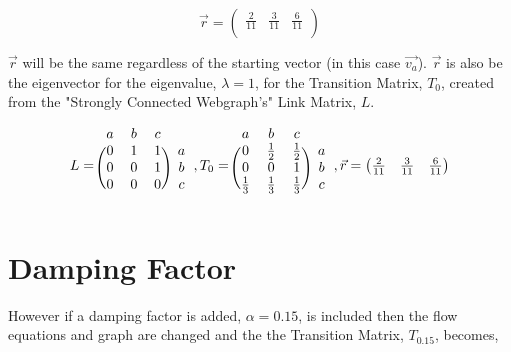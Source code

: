\documentclass[12pt]{article}
\begin{document}
\[
\vec{r} =
%
\begin{pmatrix}
   \frac{2}{11} & \frac{3}{11} & \frac{6}{11} \\
\end{pmatrix}
\]

$\vec{r}$ will be the same regardless of the starting vector (in this case $\vec{v_a}$). $\vec{r}$ is also be the eigenvector for the eigenvalue, $\lambda = 1$, for the Transition Matrix, $T_0$, created from the "Strongly Connected Webgraph's" Link Matrix, $L$.


%
%


\[
L =
\begin{blockarray}{cccc}
a & b & c \\
\begin{block}{(ccc)c}
  0 & 1 & 1 & a \\
  0 & 0 & 1 & b \\
  0 & 0 & 0 & c \\
\end{block}
\end{blockarray}
%
,
%
T_0 = 
\begin{blockarray}{cccc}
a & b & c \\
\begin{block}{(ccc)c}
  0 & \frac{1}{2} & \frac{1}{2} & a \\
  0 & 0 & 1 & b \\
  \frac{1}{3} & \frac{1}{3} & \frac{1}{3} & c \\
\end{block}
\end{blockarray}
%
,
%
\vec{r} =
%
\begin{pmatrix}
   \frac{2}{11} & \frac{3}{11} & \frac{6}{11} \\
\end{pmatrix}
\]


%
%

\section{Damping Factor}

However if a damping factor is added, $\alpha = 0.15$, is included then the flow equations and graph are changed and the the Transition Matrix, $T_{0.15}$, becomes,
\end{document}
